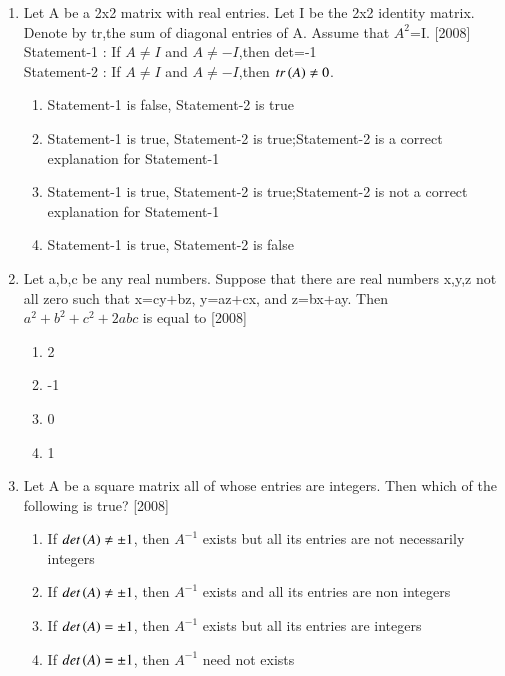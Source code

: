 \documentclass[journal,12pt,twocolumn]{IEEEtran}
\theoremstyle{remark}
\begin{document}
\begin{enumerate}
\begin{enumerate}[label=\alph*)]
\end{enumerate}
\item Let A be a 2x2 matrix with real entries. Let I be the 2x2 identity matrix. Denote by tr,the sum of diagonal entries of A. Assume that $A^2$=I. \hfill{[2008]} \\
Statement-1 : If $A \neq I$ and $A \neq -I$,then det=-1 \\
Statement-2 : If $A \neq I$ and $A \neq -I$,then $tr\left(A\right) \neq 0$.\\
\begin{enumerate}[label=\alph*)]
        \item Statement-1 is false, Statement-2 is true
        \item Statement-1 is true, Statement-2 is true;Statement-2 is a correct explanation for Statement-1
        \item Statement-1 is true, Statement-2 is true;Statement-2 is not a correct explanation for Statement-1
        \item Statement-1 is true, Statement-2 is false \\
\end{enumerate}
\item Let a,b,c be any real numbers. Suppose that there are real numbers x,y,z not all zero such that x=cy+bz, y=az+cx, and z=bx+ay. Then $a^2+b^2+c^2+2abc$ is equal to \hfill{[2008]}
\begin{enumerate}[label=\alph*)]
        \item 2         
        \item -1
        \item 0              
        \item 1 \\
\end{enumerate}
\item Let A be a square matrix all of whose entries are integers. Then which of the following is true? \hfill{[2008]} 
\begin{enumerate}[label=\alph*)]
	\item If $det\left(A\right)\neq\pm1$, then $A^{-1}$ exists but all its entries are not necessarily integers         
        \item If $det\left(A\right)\neq\pm1$, then $A^{-1}$ exists and all its entries are non integers
        \item If $det\left(A\right)=\pm1$, then $A^{-1}$ exists but all its entries are integers
	\item If $det\left(A\right)=\pm1$, then $A^{-1}$ need not exists \\

\end{enumerate}
\end{enumerate}
\end{document}
